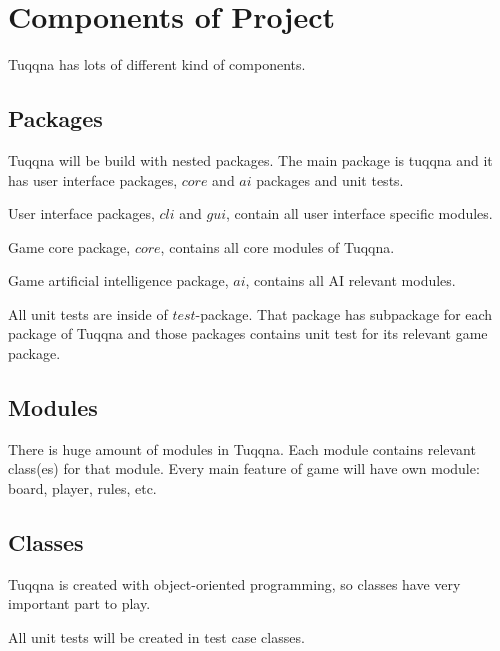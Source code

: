 \documentclass[gradu,emptyfirstpagenumber]{tktltiki}
\begin{document}
\pagebreak

\section{Components of Project}

Tuqqna has lots of different kind of components.

\subsection{Packages}

Tuqqna will be build with nested packages. The main package is tuqqna and it has
user interface packages, $core$ and $ai$ packages and unit tests.

User interface packages, $cli$ and $gui$, contain all user interface specific
modules.

Game core package, $core$, contains all core modules of Tuqqna.

Game artificial intelligence package, $ai$, contains all AI relevant modules.

All unit tests are inside of $test$-package. That package has subpackage for
each package of Tuqqna and those packages contains unit test for its relevant
game package.

\subsection{Modules}

There is huge amount of modules in Tuqqna. Each module contains relevant
class(es) for that module. Every main feature of game will have own module:
board, player, rules, etc.

\subsection{Classes}

Tuqqna is created with object-oriented programming, so classes have very
important part to play.

All unit tests will be created in test case classes.

\lastpage
\end{document}
